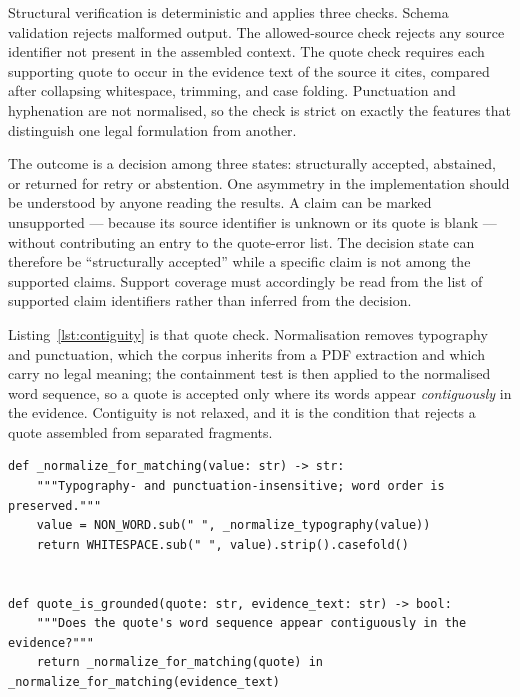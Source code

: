 Structural verification is deterministic and applies three checks. Schema validation rejects malformed output. The allowed-source check rejects any source identifier not present in the assembled context. The quote check requires each supporting quote to occur in the evidence text of the source it cites, compared after collapsing whitespace, trimming, and case folding. Punctuation and hyphenation are not normalised, so the check is strict on exactly the features that distinguish one legal formulation from another.

The outcome is a decision among three states: structurally accepted, abstained, or returned for retry or abstention. One asymmetry in the implementation should be understood by anyone reading the results. A claim can be marked unsupported --- because its source identifier is unknown or its quote is blank --- without contributing an entry to the quote-error list. The decision state can therefore be ``structurally accepted'' while a specific claim is not among the supported claims. Support coverage must accordingly be read from the list of supported claim identifiers rather than inferred from the decision.

Listing~\ref{lst:contiguity} is that quote check. Normalisation removes
typography and punctuation, which the corpus inherits from a PDF extraction and
which carry no legal meaning; the containment test is then applied to the
normalised word sequence, so a quote is accepted only where its words appear
\emph{contiguously} in the evidence. Contiguity is not relaxed, and it is the
condition that rejects a quote assembled from separated fragments.

\begin{lstlisting}[style=thesis,caption={The check the argument of this thesis rests on. Source: \texttt{src/aviation\_rag/generation/verification.py}, lines 72--80; reproduced with the byte-level rule beside it in Appendix~\ref{app:code}.},label={lst:contiguity}]
def _normalize_for_matching(value: str) -> str:
    """Typography- and punctuation-insensitive; word order is preserved."""
    value = NON_WORD.sub(" ", _normalize_typography(value))
    return WHITESPACE.sub(" ", value).strip().casefold()


def quote_is_grounded(quote: str, evidence_text: str) -> bool:
    """Does the quote's word sequence appear contiguously in the evidence?"""
    return _normalize_for_matching(quote) in _normalize_for_matching(evidence_text)
\end{lstlisting}

